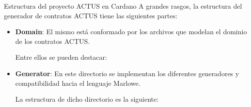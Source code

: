 \documentclass{beamer}
\begin{document}
\begin{frame}[fragile]{Estructura del proyecto ACTUS en Cardano}
A grandes rasgos, la estructura del generador de contratos ACTUS tiene las siguientes partes:
    \vfill
    
\begin{itemize}
    \item  \textbf{Domain}: El mismo está conformado por los archivos que modelan el dominio de los contratos ACTUS.
        \medskip

        \pause Entre ellos se pueden destacar:

        

\end{itemize}
\end{frame}

\begin{frame}[fragile]
\begin{itemize}
    \item \textbf{Generator}: En este directorio se implementan los diferentes generadores y compatibilidad hacia el lenguaje
Marlowe.
    
    \medskip

    \pause La estructura de dicho directorio es la siguiente:


\end{itemize}
\end{frame}
\end{document}
